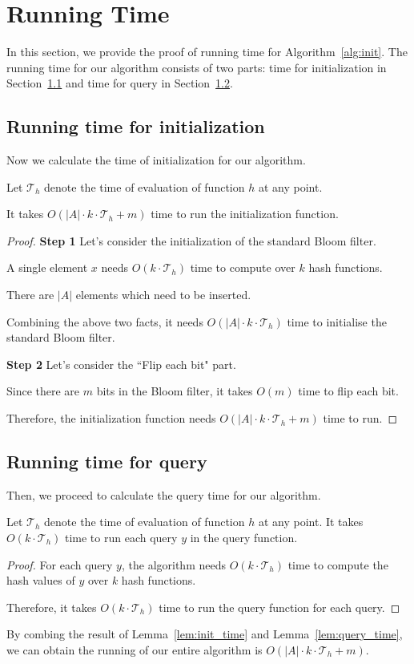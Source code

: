 \section{Running Time}\label{sec:appendix_running_time}
In this section, we provide the proof of running time for Algorithm~\ref{alg:init}. The running time for our algorithm consists of two parts: time for initialization in Section~\ref{sec:time_init} and time for query 
in Section~\ref{sec:time_query}. 
\subsection{Running time for initialization}\label{sec:time_init}
Now we calculate the time of initialization for our algorithm. 
\begin{lemma}\label{lem:init_time}
Let $\mathcal{T}_h$ denote the time of evaluation of function $h$ at any point. 

It takes $O(|A| \cdot k \cdot \mathcal{T}_h + m)$ time to run the initialization function.
\end{lemma}
\begin{proof}
 
{\bf Step 1} Let's consider the initialization of the standard Bloom filter. 

A single element $x$ needs $O(k \cdot \mathcal{T}_h)$ time to compute over $k$ hash functions. 

There are $|A|$ elements which need to be inserted. 

Combining the above two facts, it needs $O(|A| \cdot k \cdot \mathcal{T}_h)$ time to initialise the standard Bloom filter. 

{\bf Step 2} Let's consider the ``Flip each bit" part. 

Since there are $m$ bits in the Bloom filter, it takes $O(m)$ time to flip each bit.

Therefore, the initialization function needs $O(|A| \cdot k \cdot \mathcal{T}_h + m)$ time to run. 

\end{proof}

\subsection{Running time for query}\label{sec:time_query}
Then, we proceed to calculate the query time for our algorithm.

\begin{lemma}\label{lem:query_time}
Let $\mathcal{T}_h$ denote the time of evaluation of function $h$ at any point. 
It takes $O(k \cdot \mathcal{T}_h)$ time to run each query $y$ in the query function.
\end{lemma}
\begin{proof}

For each query $y$, the algorithm needs $O(k \cdot \mathcal{T}_h)$ time to compute the hash values of $y$ over $k$ hash functions. 

Therefore, it takes $O(k\cdot \mathcal{T}_h)$ time to run the query function for each query. 
\end{proof}

By combing the result of Lemma~\ref{lem:init_time} and Lemma~\ref{lem:query_time}, we can obtain the running of our entire algorithm is $O(|A|\cdot k \cdot \mathcal{T}_h + m)$.


